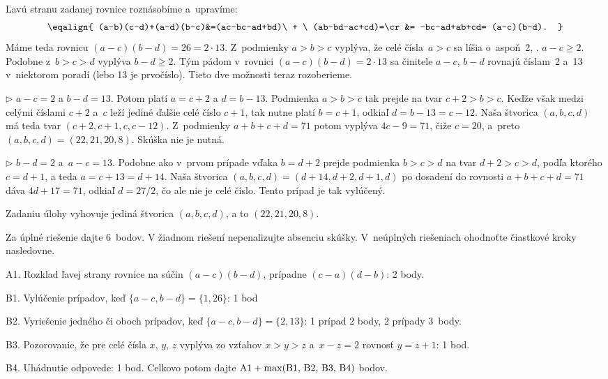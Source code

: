 {%
Ľavú stranu zadanej rovnice roznásobíme a~upravíme:
$$
\eqalign{
(a-b)(c-d)+(a-d)(b-c)&=(ac-bc-ad+bd)\ + \ (ab-bd-ac+cd)=\cr
&= -bc-ad+ab+cd= (a-c)(b-d).
}
$$
Máme teda rovnicu $(a-c)(b-d)=26=2\cdot13$. Z~podmienky $a>b>c$ vyplýva,
že celé čísla~$a>c$ sa líšia o~aspoň~2, \tj. $a-c\ge2$.
Podobne z~$b>c>d$ vyplýva $b-d\ge2$. Tým pádom v~rovnici
$(a-c)(b-d)=2\cdot13$ sa činitele $a-c$, $b-d$ rovnajú číslam~2 a~13
v~niektorom poradí (lebo 13 je prvočíslo). Tieto dve možnosti teraz
rozoberieme.

\item{$\triangleright$}
$a-c=2$ a $b-d=13$.
Potom platí $a=c+2$ a $d=b-13$. Podmienka $a>b>c$
tak prejde na tvar $c+2>b>c$. Keďže však medzi celými
číslami $c+2$ a~$c$ leží jediné ďalšie celé číslo $c+1$, tak nutne
platí $b=c+1$, odkiaľ $d=b-13=c-12$. Naša štvorica
$(a,b,c,d)$ má teda tvar $(c+2,c+1,c,c-12)$. Z~podmienky
$a+b+c+d=71$ potom vyplýva $4c-9=71$, čiže $c=20$, a~preto
$(a,b,c,d)=(22,21,20,8)$. Skúška nie je nutná.

\item{$\triangleright$}
$b-d=2$ a~$a-c=13$. Podobne ako v~prvom prípade vďaka $b=d+2$
prejde podmienka $b>c>d$ na tvar $d+2>c>d$, podľa
ktorého $c=d+1$, a teda $a=c+13=d+14$. Naša štvorica
$(a,b,c,d)=(d+14,d+2,d+1,d)$ po dosadení do rovnosti $a+b+c+d=71$
dáva $4d+17=71$, odkiaľ $d=27/2$, čo ale nie je celé číslo.
Tento prípad je tak vylúčený.

\zaver
Zadaniu úlohy vyhovuje jediná štvorica $(a,b,c,d)$,
a to $(22,21,20,8)$.

\schemaABC
Za úplné riešenie dajte 6~bodov. V žiadnom riešení nepenalizujte
absenciu skúšky. V~neúplných riešeniach ohodnoťte čiastkové kroky
nasledovne.
\item{A1.} Rozklad ľavej strany rovnice na súčin $(a-c)(b-d)$, prípadne $(c-a)(d-b)$: 2 body.
\item{B1.} Vylúčenie prípadov, keď $\{a-c,b-d\}=\{1,26\}$: 1 bod
\item{B2.} Vyriešenie jedného či oboch prípadov, keď $\{a-c,b-d\}=\{2,13\}$: 1 prípad 2 body, 2 prípady 3~body.
\item{B3.} Pozorovanie, že pre celé čísla $x$, $y$, $z$ vyplýva zo vzťahov $x>y>z$ a~$x-z=2$ rovnosť $y=z+1$: 1 bod.
\item{B4.} Uhádnutie odpovede: 1 bod.
\endgraf\noindent
Celkovo potom dajte $\rm A1+\max(B1,\,B2,\,B3,\,B4)$ bodov.
\endschema
}

